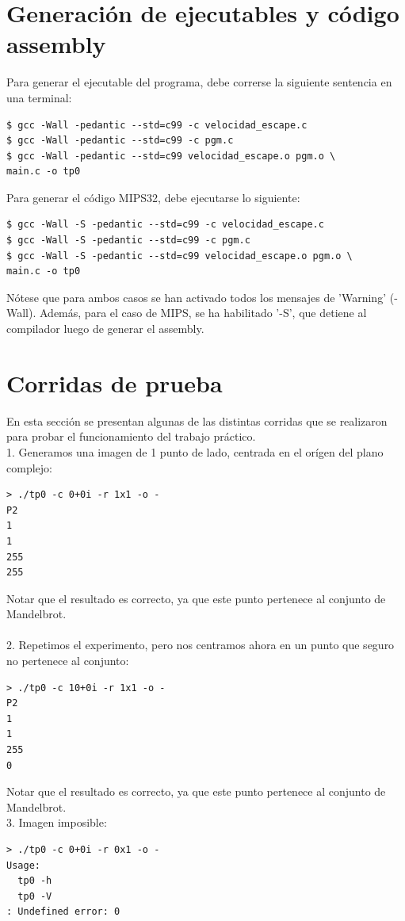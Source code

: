\documentclass[a4paper,10pt]{article}
\begin{document}
\section{Generaci\'on de ejecutables y c\'odigo assembly}
Para generar el ejecutable del programa, debe correrse la siguiente sentencia en una terminal:

\begin{verbatim}
$ gcc -Wall -pedantic --std=c99 -c velocidad_escape.c
$ gcc -Wall -pedantic --std=c99 -c pgm.c
$ gcc -Wall -pedantic --std=c99 velocidad_escape.o pgm.o \
main.c -o tp0
\end{verbatim}

Para generar el c\'odigo MIPS32, debe ejecutarse lo siguiente:
\begin{verbatim}
$ gcc -Wall -S -pedantic --std=c99 -c velocidad_escape.c
$ gcc -Wall -S -pedantic --std=c99 -c pgm.c
$ gcc -Wall -S -pedantic --std=c99 velocidad_escape.o pgm.o \
main.c -o tp0
\end{verbatim}

N\'otese que para ambos casos se han activado todos los mensajes de 'Warning' (-Wall). Adem\'as, para el caso de MIPS, se ha habilitado '-S', que detiene al compilador luego de generar el assembly.
\pagebreak




\section{Corridas de prueba}

En esta secci\'on se presentan algunas de las distintas corridas que se 
realizaron para probar el funcionamiento del trabajo pr\'actico.\\

1. Generamos una imagen de 1 punto de lado, centrada en el or\'igen del plano complejo:
\begin{verbatim}
> ./tp0 -c 0+0i -r 1x1 -o -
P2
1
1
255
255
\end{verbatim}

Notar que el resultado es correcto, ya que este punto pertenece al conjunto de Mandelbrot.\\
\\
2. Repetimos el experimento, pero nos centramos ahora en un punto que seguro no pertenece
al conjunto:
\begin{verbatim}
> ./tp0 -c 10+0i -r 1x1 -o -
P2
1
1
255
0
\end{verbatim}

Notar que el resultado es correcto, ya que este punto pertenece al conjunto de Mandelbrot.
\\
3. Imagen imposible:
\begin{verbatim}
> ./tp0 -c 0+0i -r 0x1 -o -
Usage:
  tp0 -h
  tp0 -V
: Undefined error: 0
\end{verbatim}
\end{document}
